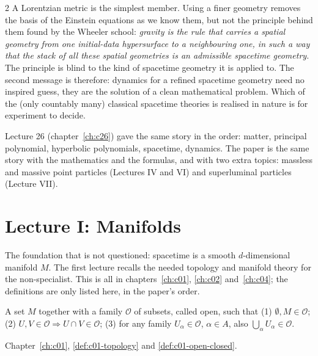 \begin{paracol}{2}
A Lorentzian metric is the simplest member. Using a finer geometry removes the basis of the Einstein equations as we know them, but not the principle behind them found by the Wheeler school: \emph{gravity is the rule that carries a spatial geometry from one initial-data hypersurface to a neighbouring one, in such a way that the stack of all these spatial geometries is an admissible spacetime geometry.} The principle is blind to the kind of spacetime geometry it is applied to. The second message is therefore: dynamics for a refined spacetime geometry need no inspired guess, they are the solution of a clean mathematical problem. Which of the (only countably many) classical spacetime theories is realised in nature is for experiment to decide.

\begin{coursenote}
Lecture 26 (chapter~\ref{ch:c26}) gave the same story in the order: matter, principal polynomial, hyperbolic polynomials, spacetime, dynamics. The paper is the same story with the mathematics and the formulas, and with two extra topics: massless and massive point particles (Lectures IV and VI) and superluminal particles (Lecture VII).
\end{coursenote}

\section{Lecture I: Manifolds}\label{sec:c29-L1}

 The foundation that is not questioned: spacetime is a smooth $d$-dimensional manifold $M$. The first lecture recalls the needed topology and manifold theory for the non-specialist. This is all in chapters~\ref{ch:c01}, \ref{ch:c02} and~\ref{ch:c04}; the definitions are only listed here, in the paper's order.

\begin{definition}\label{def:c29-top}
A set $M$ together with a family $\mathcal O$ of subsets, called open, such that (1) $\emptyset,M\in\mathcal O$; (2) $U,V\in\mathcal O\Rightarrow U\cap V\in\mathcal O$; (3) for any family $U_\alpha\in\mathcal O$, $\alpha\in A$, also $\bigcup_{\alpha}U_\alpha\in\mathcal O$.
\end{definition}
\begin{recall}[Topology]
Chapter~\ref{ch:c01}, \cref{def:c01-topology} and \cref{def:c01-open-closed}.
\end{recall}


\end{paracol}
